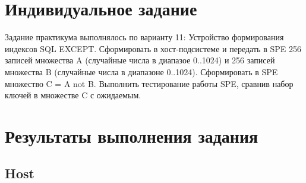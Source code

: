 \section{Индивидуальное задание}

Задание практикума выполнялось по варианту 11:
Устройство формирования индексов SQL EXCEPT. Сформировать в хост-подсистеме и передать в SPE 256 записей множества A (случайные числа в диапазое 0..1024) и 256 записей множества B (случайные числа в диапазоне 0..1024). Сформировать в SPE множество C = A not B. Выполнить тестирование работы SPE, сравнив набор ключей в множестве C с ожидаемым.

\section{Результаты выполнения задания}

\subsection{Host}

